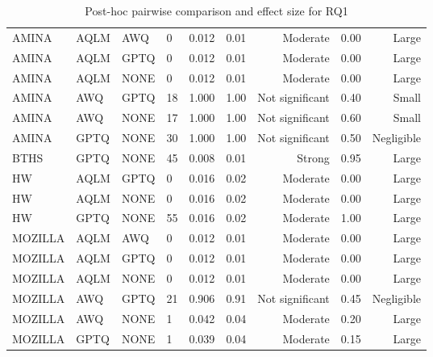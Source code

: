 \begin{table}[ht]
\begin{subtable}[t]{0.47\textwidth}
\begin{tabular}{llllllrlr}
    \midrule
    AMINA & AQLM & AWQ & 0 & 0.012 & 0.01 & Moderate & 0.00 & Large \\
    AMINA & AQLM & GPTQ & 0 & 0.012 & 0.01 & Moderate & 0.00 & Large \\
    AMINA & AQLM & NONE & 0 & 0.012 & 0.01 & Moderate & 0.00 & Large \\
    AMINA & AWQ & GPTQ & 18 & 1.000 & 1.00 & Not significant & 0.40 & Small \\
    AMINA & AWQ & NONE & 17 & 1.000 & 1.00 & Not significant & 0.60 & Small \\
    AMINA & GPTQ & NONE & 30 & 1.000 & 1.00 & Not significant & 0.50 & Negligible \\
    BTHS & GPTQ & NONE & 45 & 0.008 & 0.01 & Strong & 0.95 & Large \\
    HW & AQLM & GPTQ & 0 & 0.016 & 0.02 & Moderate & 0.00 & Large \\
    HW & AQLM & NONE & 0 & 0.016 & 0.02 & Moderate & 0.00 & Large \\
    HW & GPTQ & NONE & 55 & 0.016 & 0.02 & Moderate & 1.00 & Large \\
    MOZILLA & AQLM & AWQ & 0 & 0.012 & 0.01 & Moderate & 0.00 & Large \\
    MOZILLA & AQLM & GPTQ & 0 & 0.012 & 0.01 & Moderate & 0.00 & Large \\
    MOZILLA & AQLM & NONE & 0 & 0.012 & 0.01 & Moderate & 0.00 & Large \\
    MOZILLA & AWQ & GPTQ & 21 & 0.906 & 0.91 & Not significant & 0.45 & Negligible \\
    MOZILLA & AWQ & NONE & 1 & 0.042 & 0.04 & Moderate & 0.20 & Large \\
    MOZILLA & GPTQ & NONE & 1 & 0.039 & 0.04 & Moderate & 0.15 & Large \\
    \bottomrule
    \end{tabular}
    
\end{subtable}
\caption{Post-hoc pairwise comparison and effect size for RQ1}
\label{tab:RQ1_posthoc_full}
\end{table}